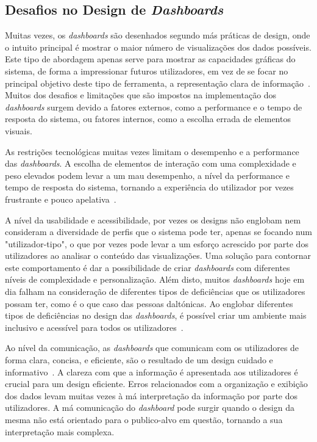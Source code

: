 \subsection{Desafios no Design de \textit{Dashboards}}
\label{sub:desafios_design}

Muitas vezes, os \textit{dashboards} são desenhados segundo más práticas de design, onde o intuito principal é mostrar o maior número de visualizações dos dados possíveis. Este tipo de abordagem apenas serve para mostrar as capacidades gráficas do sistema, de forma a impressionar futuros utilizadores, em vez de se focar no principal objetivo deste tipo de ferramenta, a representação clara de informação~\cite{janes2013effective}. Muitos dos desafios e limitações que são impostos na implementação dos \textit{dashboards} surgem devido a fatores externos, como a performance e o tempo de resposta do sistema, ou fatores internos, como a escolha errada de elementos visuais. 

As restrições tecnológicas muitas vezes limitam o desempenho e a performance das \textit{dashboards}. A escolha de elementos de interação com uma complexidade e peso elevados podem levar a um mau desempenho, a nível da performance e tempo de resposta do sistema, tornando a experiência do utilizador por vezes frustrante e pouco apelativa~\cite{eckerson2010performance}. 

A nível da usabilidade e acessibilidade, por vezes os designs não englobam nem consideram a diversidade de perfis que o sistema pode ter, apenas se focando num "utilizador-tipo", o que por vezes pode levar a um esforço acrescido por parte dos utilizadores ao analisar o conteúdo das visualizações. Uma solução para contornar este comportamento é dar a possibilidade de criar \textit{dashboards} com diferentes níveis de complexidade e personalização. Além disto, muitos \textit{dashboards} hoje em dia falham na consideração de diferentes tipos de deficiências que os utilizadores possam ter, como é o que caso das pessoas daltónicas. Ao englobar diferentes tipos de deficiências no design das \textit{dashboards}, é possível criar um ambiente mais inclusivo e acessível para todos os utilizadores~\cite{ware2019information}.

Ao nível da comunicação, as \textit{dashboards} que comunicam com os utilizadores de forma clara, concisa, e eficiente, são o resultado de um design cuidado e informativo~\cite{few2005common}. A clareza com que a informação é apresentada aos utilizadores é crucial para um design eficiente. Erros relacionados com a organização e exibição dos dados levam muitas vezes à má interpretação da informação por parte dos utilizadores. A má comunicação do \textit{dashboard} pode surgir quando o design da mesma não está orientado para o publico-alvo em questão, tornando a sua interpretação mais complexa.

